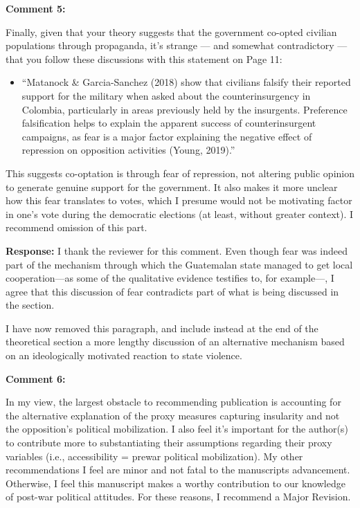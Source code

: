 \documentclass[12pt, a4paper, notitlepage]{article}
\begin{document}
\vspace{15pt}
\noindent\textbf{Comment 5:}
\begin{displayquote}
Finally, given that your theory suggests that the government co-opted civilian populations through propaganda, it’s strange — and somewhat contradictory — that you follow these discussions with this statement on Page 11:
\begin{itemize}
  \item[] ``Matanock \& Garcia-Sanchez (2018) show that civilians falsify their reported support for the military when asked about the counterinsurgency in Colombia, particularly in areas previously held by the insurgents. Preference falsification helps to explain the apparent success of counterinsurgent campaigns, as fear is a major factor explaining the negative effect of repression on opposition activities (Young, 2019).''
\end{itemize}
This suggests co-optation is through fear of repression, not altering public opinion to generate genuine support for the government. It also makes it more unclear how this fear translates to votes, which I presume would not be motivating factor in one’s vote during the democratic elections (at least, without greater context). I recommend omission of this part.
\end{displayquote}

\noindent\textbf{Response:} I thank the reviewer for this comment. Even though fear was indeed part of the mechanism through which the Guatemalan state managed to get local cooperation---as some of the qualitative evidence testifies to, for example---, I agree that this discussion of fear contradicts part of what is being discussed in the section.

I have now removed this paragraph, and include instead at the end of the theoretical section a more lengthy discussion of an alternative mechanism based on an ideologically motivated reaction to state violence.

\vspace{15pt}
\noindent\textbf{Comment 6:}
\begin{displayquote}
In my view, the largest obstacle to recommending publication is accounting for the alternative explanation of the proxy measures capturing insularity and not the opposition’s political mobilization. I also feel it’s important for the author(s) to contribute more to substantiating their assumptions regarding their proxy variables (i.e., accessibility = prewar political mobilization). My other recommendations I feel are minor and not fatal to the manuscripts advancement. Otherwise, I feel this manuscript makes a worthy contribution to our knowledge of post-war political attitudes. For these reasons, I recommend a Major Revision.
\end{displayquote}
\end{document}
